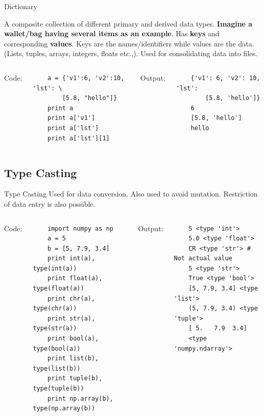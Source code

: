 \documentclass[10pt]{beamer}
\begin{document}
\begin{frame}[fragile]{Dictionary}

A composite collection of different primary and derived data types. \textbf{Imagine a wallet/bag having several items as an example}. Has \textbf{keys} and corresponding \textbf{values}. Keys are the names/identifiers while values are the data. (Lists, tuples, arrays, integers, floats etc.,). Used for consolidating data into files.
\begin{columns}[t]
	Code:
\begin{lstlisting}
	a = {'v1':6, 'v2':10, 'lst': \
	    [5.8, "hello"]}
	print a
	print a['v1']
	print a['lst']
	print a['lst'][1]
\end{lstlisting}
	Output:
\begin{lstlisting}
	{'v1': 6, 'v2': 10, 'lst':
	    [5.8, 'hello']}
	6
	[5.8, 'hello']
	hello
\end{lstlisting}	
	\end{columns}
\end{frame}

\subsection{Type Casting}
\begin{frame}[fragile]{Type Casting}
Used for data conversion. Also used to avoid mutation. Restriction of data entry is also possible.

\begin{columns}[t]
	Code:
\begin{lstlisting}
	import numpy as np
	a = 5
	b = [5, 7.9, 3.4]
	print int(a), type(int(a))           
	print float(a), type(float(a))       
	print chr(a), type(chr(a))          
	print str(a), type(str(a))          
	print bool(a), type(bool(a))        
	print list(b), type(list(b))         
	print tuple(b), type(tuple(b))       
	print np.array(b), type(np.array(b))
\end{lstlisting}
	Output:
\begin{lstlisting}
	5 <type 'int'>
	5.0 <type 'float'>
	CR <type 'str'> # Not actual value
	5 <type 'str'>
	True <type 'bool'>
	[5, 7.9, 3.4] <type 'list'>
	(5, 7.9, 3.4) <type 'tuple'>
	[ 5.   7.9  3.4] 
	<type 'numpy.ndarray'>
\end{lstlisting}
\end{columns}
\end{frame}
\end{document}
